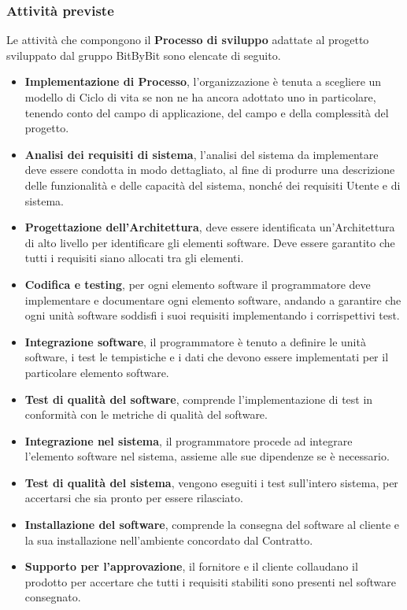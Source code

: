 \documentclass[a4paper,12pt]{article}
\begin{document}
\subsubsection{Attività previste}
Le attività che compongono il \textbf{Processo di sviluppo} adattate al progetto sviluppato dal gruppo BitByBit sono elencate di seguito.
\begin{itemize}
    \item \textbf{Implementazione di Processo}, l'organizzazione è tenuta a scegliere un modello di Ciclo di vita se non ne ha ancora adottato uno in particolare, tenendo conto del campo di applicazione, del campo e della complessità del progetto.
    \item \textbf{Analisi dei requisiti di sistema}, l'analisi del sistema da implementare deve essere condotta in modo dettagliato, al fine di produrre una descrizione delle funzionalità e delle capacità del sistema, nonché dei requisiti Utente e di sistema.
    \item \textbf{Progettazione dell'Architettura}, deve essere identificata un'Architettura di alto livello per identificare gli elementi software. Deve essere garantito che tutti i requisiti siano allocati tra gli elementi.
    \item \textbf{Codifica e testing}, per ogni elemento software il programmatore deve implementare e documentare ogni elemento software, andando a garantire che ogni unità software soddisfi i suoi requisiti implementando i corrispettivi test.
    \item \textbf{Integrazione software}, il programmatore è tenuto a definire le unità software, i test le tempistiche e i dati che devono essere implementati per il particolare elemento software.
    \item \textbf{Test di qualità del software}, comprende l'implementazione di test in conformità con le metriche di qualità del software.
    \item \textbf{Integrazione nel sistema}, il programmatore procede ad integrare l'elemento software nel sistema, assieme alle sue dipendenze se è necessario.
    \item \textbf{Test di qualità del sistema}, vengono eseguiti i test sull'intero sistema, per accertarsi che sia pronto per essere rilasciato.
    \item \textbf{Installazione del software}, comprende la consegna del software al cliente e la sua installazione nell'ambiente concordato dal Contratto.
    \item \textbf{Supporto per l'approvazione},  il fornitore e il cliente collaudano il prodotto per accertare che tutti i requisiti stabiliti sono presenti nel software consegnato.
\end{itemize}
\end{document}
